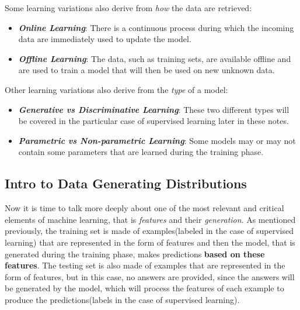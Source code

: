 \noindent Some learning variations also derive from \emph{how} the data
are retrieved:

\begin{itemize}
      \item \emph{\textbf{Online Learning}}: There is a continuous
            process during which the incoming data are immediately
            used to update the model.

      \item \emph{\textbf{Offline Learning}}: The data, such as training
            sets, are available offline and are used to train a model
            that will then be used on new unknown data.
\end{itemize}

\noindent Other learning variations also derive from the \emph{type} of
a model:

\begin{itemize}
      \item \emph{\textbf{Generative vs Discriminative Learning}}:
            These two different types will be covered in the
            particular case of supervised learning later in these notes.
      \item \emph{\textbf{Parametric vs Non-parametric Learning}}:
            Some models may or may not contain some parameters that
            are learned during the training phase.
\end{itemize}

\subsection{Intro to Data Generating Distributions}

Now it is time to talk more deeply about one of the most relevant
and critical elements of machine learning, that is \emph{features}
and their \emph{generation}. As mentioned previously, the training
set is made of examples(labeled in the case of supervised learning)
that are represented in the form of features and then the model,
that is generated during the training phase, makes predictions
\textbf{based on these features}. The testing set is also made of
examples that are represented in the form of features, but in this
case, no answers are provided, since the answers will be generated by
the model, which will process the features of each example to produce
the predictions(labels in the case of supervised learning).

\newpage

